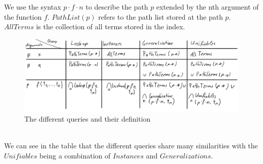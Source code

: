 We use the syntax $p \cdot f \cdot n$ to describe the path $p$ extended by the nth argument of the function $f$. $PathList(p)$ refers to the path list stored at the path $p$. $AllTerms$ is the collection of all terms stored in the index.
\begin{figure}[h]
\centering
\includegraphics[scale=0.25]{figures/queries.png}
\caption{The different queries and their definition}
\end{figure}\\
We can see in the table that the different queries share many similarities with the $Unifiables$ being a combination of $Instances$ and $Generalizations$.

